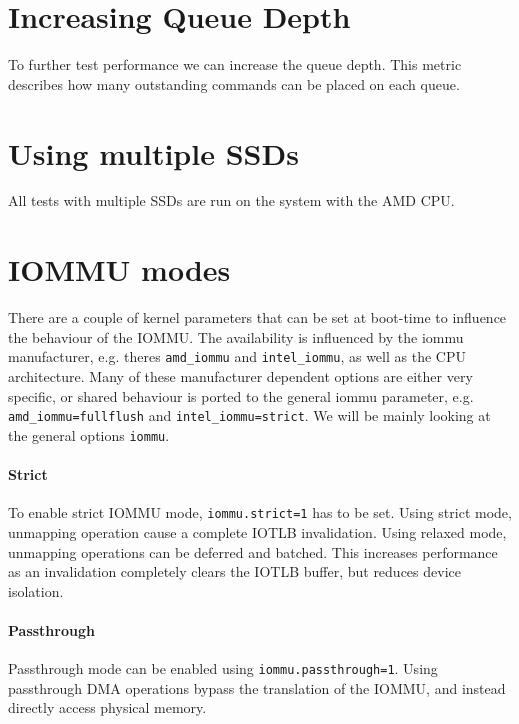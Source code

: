 \section{Increasing Queue Depth}
To further test performance we can increase the queue depth. This metric describes how many outstanding commands can be placed on each queue.

\section{Using multiple SSDs}
All tests with multiple SSDs are run on the system with the AMD CPU.

\section{IOMMU modes}
There are a couple of kernel parameters that can be set at boot-time to influence the behaviour of the IOMMU. The availability is influenced by the iommu manufacturer, e.g. theres \texttt{amd\_iommu} and \texttt{intel\_iommu}, as well as the CPU architecture. Many of these manufacturer dependent options are either very specific, or shared behaviour is ported to the general iommu parameter, e.g. \texttt{amd\_iommu=fullflush} and \texttt{intel\_iommu=strict}. We will be mainly looking at the general options \texttt{iommu}.

\paragraph{Strict}
To enable strict IOMMU mode, \texttt{iommu.strict=1} has to be set. Using strict mode, unmapping operation cause a complete IOTLB invalidation. Using relaxed mode, unmapping operations can be deferred and batched. This increases performance as an invalidation completely clears the IOTLB buffer, but reduces device isolation.

\paragraph{Passthrough}
Passthrough mode can be enabled using \texttt{iommu.passthrough=1}. Using passthrough DMA operations bypass the translation of the IOMMU, and instead directly access physical memory.